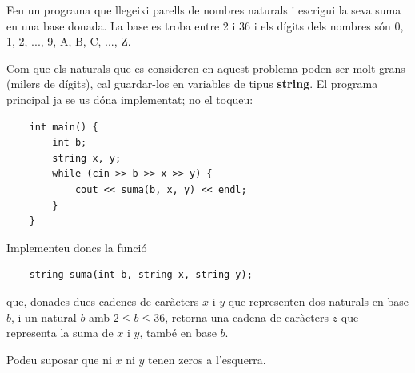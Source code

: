 

\Statement

Feu un programa que llegeixi parells de nombres naturals i escrigui la seva suma en una base donada.
La base es troba entre 2 i 36 i els dígits dels nombres són 0, 1, 2, ..., 9, A, B, C, ..., Z.

\medskip

Com que els naturals que es consideren en aquest problema poden ser
molt grans (milers de dígits), cal guardar-los en variables de tipus
\textbf{string}. El programa principal ja se us dóna implementat; no el toqueu:

\begin{lstlisting}
    int main() {
        int b;
        string x, y;
        while (cin >> b >> x >> y) {
            cout << suma(b, x, y) << endl;
        }
    }
\end{lstlisting}


Implementeu doncs la funció
\begin{lstlisting}
    string suma(int b, string x, string y);
\end{lstlisting}

que, donades dues cadenes de caràcters $x$ i $y$ que representen dos naturals
en base $b$, i un natural $b$ amb $2\le b\le 36$,
retorna una cadena de caràcters $z$ que representa la suma
de $x$ i $y$, també en base $b$.

\medskip

Podeu suposar que ni $x$ ni $y$ tenen zeros a l'esquerra.

\SampleOneCol

